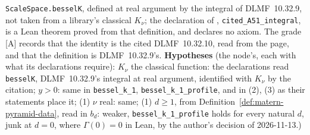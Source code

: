 \begin{lemma}
{\texttt{ScaleSpace.besselK}, defined at real argument by the integral of DLMF~10.32.9, not taken
from a library's classical $K_\nu$; the declaration of ,
\texttt{cited\_A51\_integral}, is a Lean theorem proved from that definition, and declares no
axiom. The grade [A] records that the identity is the cited DLMF~10.32.10, read from the page, and
that the definition is DLMF~10.32.9's. \textbf{Hypotheses} (the node's, each with what its
declarations require): $K_\nu$ the classical function: the declarations read
\texttt{besselK}, DLMF~10.32.9's integral at real argument, identified with $K_\nu$ by the citation;
$y > 0$: same in \texttt{bessel\_k\_1}, \texttt{bessel\_k\_1\_profile}, and in (2), (3) as their
statements place it; (1) $\nu$ real: same; (1) $d \ge 1$, from
Definition~\ref{def:matern-pyramid-data}, read in $b_d$: weaker,
\texttt{bessel\_k\_1\_profile} holds for every natural $d$, junk at $d = 0$, where
$\Gamma(0) = 0$ in Lean, by the author's decision of 2026-11-13.)}
\end{lemma}


